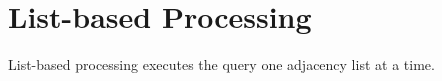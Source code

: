 \section{List-based Processing}
\label{sec:list-based-proc}

List-based processing executes the query one adjacency list at a time. 









